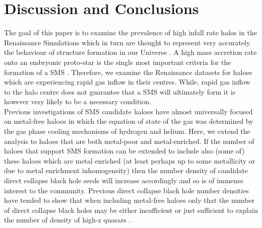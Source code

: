 \documentclass[graphics, twocolumn, usenatbib]{mn2e}
\begin{document}
\section{Discussion and Conclusions} \label{Sec:Discussion}
The goal of this paper is to examine the prevalence of high infall rate halos in the
Renaissance Simulations which in turn are thought to represent very accurately the
behaviour of structure formation in our Universe \citep{Chen_2014, Xu_2013, Xu_2014, OShea_2015,
  Barrow_2017, Wise_2019}. A high mass accretion rate onto an embryonic proto-star is the
single most important criteria for the formation of a SMS \citep{Hosokawa_2013, Sakurai_2016,
  Woods_2018}. Therefore, we examine the Renaissance datasets for haloes which are experiencing
rapid gas inflow in their centres. While, rapid gas inflow to the halo centre does not guarantee
that a SMS will ultimately form it is however very likely to be a necessary condition. \\
\indent Previous investigations of SMS candidate haloes have almost universally focused on
metal-free haloes in which the equation of state of the gas was determined by the gas phase
cooling mechanisms of hydrogen and helium. Here, we extend the analysis to haloes that are both
metal-poor and metal-enriched. If the number of haloes that support SMS formation can be extended to
include also (some of) these haloes which are metal enriched (at least perhaps up to some
metallicity or due to metal enrichment inhomogeneity) then the
number density of candidate direct collapse black hole seeds will increase accordingly and so is of
immense interest to the community. Previous direct collapse black hole number densities have
tended to show that when including metal-free haloes only  that the number of direct collapse
black holes may be either insufficient or just sufficient to explain the number of density of
high-z quasars \citep{Agarwal_2012, Visbal_2014b, Agarwal_2015b, Latif_2014a,
  Valiante_2016, Habouzit_2016, Valiante_2017, Habouzit_2017, Regan_2017}. \\
\end{document}
